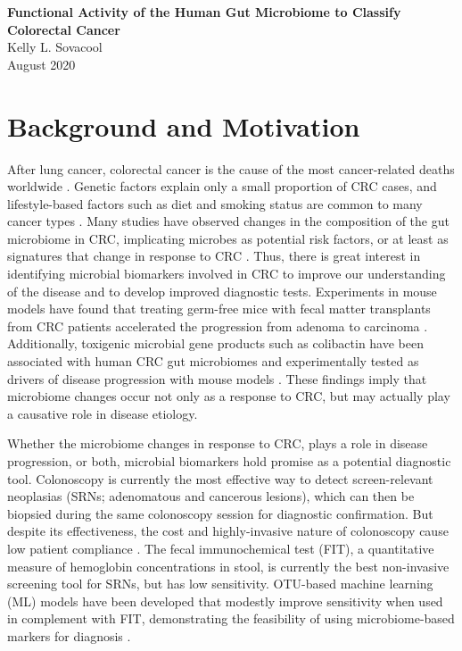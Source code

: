 \documentclass[11pt]{article}
\begin{document}
\sloppy
\begin{center}
\large{\textbf{
    Functional Activity of the Human Gut Microbiome to Classify Colorectal Cancer
}} \\
\vspace{11pt}
\small{
    Kelly L. Sovacool \\
    August 2020
}
\end{center}



\section*{Background and Motivation} %

After lung cancer, colorectal cancer is the cause of the most cancer-related deaths worldwide \cite{ferlay_cancer_2015}.
Genetic factors explain only a small proportion of CRC cases, and lifestyle-based factors such as diet and smoking status are common to many cancer types \cite{thomas_metagenomic_2019}.
Many studies have observed changes in the composition of the gut microbiome in CRC, implicating microbes as potential risk factors, or at least as signatures that change in response to CRC \cite{kostic_genomic_2012, chen_decreased_2013}.
Thus, there is great interest in identifying microbial biomarkers involved in CRC to improve our understanding of the disease and to develop improved diagnostic tests.
Experiments in mouse models have found that treating germ-free mice with fecal matter transplants from CRC patients accelerated the progression from adenoma to carcinoma \cite{li_gut_2019, sobhani_colorectal_2019}.
Additionally, toxigenic microbial gene products such as colibactin have been associated with human CRC gut microbiomes and experimentally tested as drivers of disease progression with mouse models \cite{cougnoux_bacterial_2014, gagnaire_collateral_2017, thakur_unveiling_2019}.
These findings imply that microbiome changes occur not only as a response to CRC,
but may actually play a causative role in disease etiology.

Whether the microbiome changes in response to CRC, plays a role in disease progression, or both,
microbial biomarkers hold promise as a potential diagnostic tool.
Colonoscopy is currently the most effective way to detect screen-relevant neoplasias (SRNs; adenomatous and cancerous lesions),
which can then be biopsied during the same colonoscopy session for diagnostic confirmation.
But despite its effectiveness, the cost and highly-invasive nature of colonoscopy cause low patient compliance \cite{ling_attitudes_2001, jones_patient-reported_2010}.
The fecal immunochemical test (FIT), a quantitative measure of hemoglobin concentrations in stool,
is currently the best non-invasive screening tool for SRNs, but has low sensitivity.
OTU-based machine learning (ML) models have been developed that modestly improve sensitivity when used in complement with FIT, demonstrating the feasibility of using microbiome-based markers for diagnosis \cite{baxter_microbiota-based_2016}.
\end{document}
